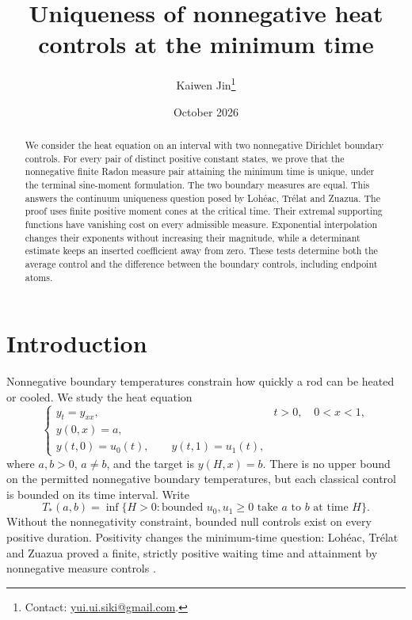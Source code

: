 \documentclass[11pt]{article}
\title{Uniqueness of nonnegative heat controls at the minimum time}
\author{Kaiwen Jin\thanks{Contact: \href{mailto:yui.ui.siki@gmail.com}{yui.ui.siki@gmail.com}.}}
\date{October 2026}
\theoremstyle{remark}
\begin{document}
\maketitle
\begin{abstract}
We consider the heat equation on an interval with two nonnegative Dirichlet
boundary controls. For every pair of distinct positive constant states, we
prove that the nonnegative finite Radon measure pair attaining the minimum
time is unique, under the terminal sine-moment formulation. The two boundary
measures are equal. This answers the continuum uniqueness question posed by
Loh\'eac, Tr\'elat and Zuazua. The proof uses finite positive moment cones at
the critical time. Their extremal supporting functions have vanishing cost
on every admissible measure. Exponential interpolation changes their
exponents without increasing their magnitude, while a determinant estimate
keeps an inserted coefficient away from zero. These tests determine both the
average control and the difference between the boundary controls, including
endpoint atoms.
\end{abstract}

\section{Introduction}

Nonnegative boundary temperatures constrain how quickly a rod can be heated
or cooled. We study the heat equation
\begin{equation}\label{eq:heat}
 \begin{cases}
 y_t=y_{xx},&t>0,\quad 0<x<1,\\
 y(0,x)=a,\\
 y(t,0)=u_0(t),\qquad y(t,1)=u_1(t),
 \end{cases}
\end{equation}
where $a,b>0$, $a\ne b$, and the target is $y(H,x)=b$.
There is no upper bound on the permitted nonnegative boundary temperatures,
but each classical control is bounded on its time interval. Write
\begin{equation}\label{eq:mintime}
 T_*(a,b)=\inf\{H>0:\text{bounded }u_0,u_1\ge0
                   \text{ take }a\text{ to }b\text{ at time }H\}.
\end{equation}
Without the nonnegativity constraint, bounded null controls exist on every
positive duration. Positivity changes the minimum-time question:
Loh\'eac, Tr\'elat and Zuazua proved a finite, strictly positive waiting time
and attainment by nonnegative measure controls
\cite[Theorem 2.1]{LTZ2017}.
\end{document}
